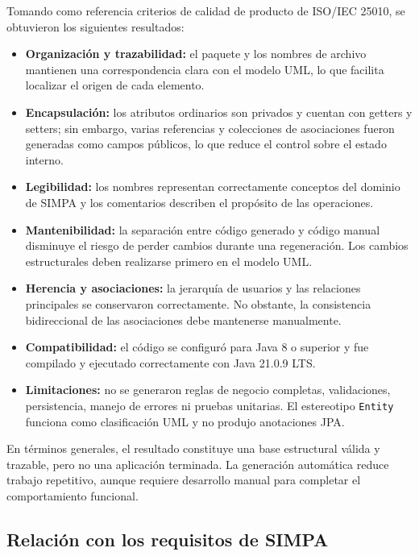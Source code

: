 Tomando como referencia criterios de calidad de producto de ISO/IEC 25010, se obtuvieron los siguientes resultados:

\begin{itemize}
    \item \textbf{Organización y trazabilidad:} el paquete y los nombres de archivo mantienen una correspondencia clara con el modelo UML, lo que facilita localizar el origen de cada elemento.

    \item \textbf{Encapsulación:} los atributos ordinarios son privados y cuentan con getters y setters; sin embargo, varias referencias y colecciones de asociaciones fueron generadas como campos públicos, lo que reduce el control sobre el estado interno.

    \item \textbf{Legibilidad:} los nombres representan correctamente conceptos del dominio de SIMPA y los comentarios describen el propósito de las operaciones.

    \item \textbf{Mantenibilidad:} la separación entre código generado y código manual disminuye el riesgo de perder cambios durante una regeneración. Los cambios estructurales deben realizarse primero en el modelo UML.

    \item \textbf{Herencia y asociaciones:} la jerarquía de usuarios y las relaciones principales se conservaron correctamente. No obstante, la consistencia bidireccional de las asociaciones debe mantenerse manualmente.

    \item \textbf{Compatibilidad:} el código se configuró para Java 8 o superior y fue compilado y ejecutado correctamente con Java 21.0.9 LTS.

    \item \textbf{Limitaciones:} no se generaron reglas de negocio completas, validaciones, persistencia, manejo de errores ni pruebas unitarias. El estereotipo \texttt{Entity} funciona como clasificación UML y no produjo anotaciones JPA.
\end{itemize}

En términos generales, el resultado constituye una base estructural válida y trazable, pero no una aplicación terminada. La generación automática reduce trabajo repetitivo, aunque requiere desarrollo manual para completar el comportamiento funcional.

\subsection{Relación con los requisitos de SIMPA}


